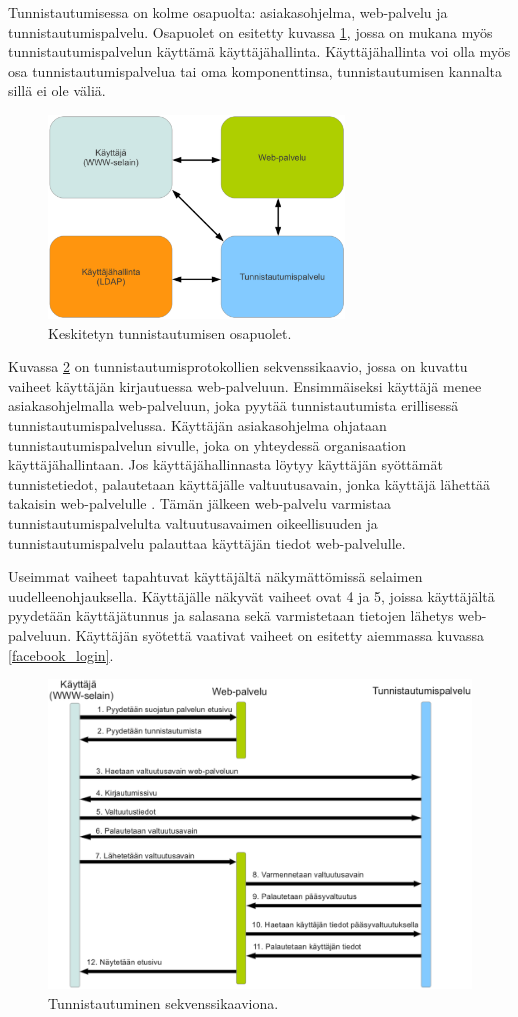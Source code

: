 Tunnistautumisessa on kolme osapuolta: asiakasohjelma, web-palvelu ja tunnistautumispalvelu. Osapuolet on esitetty kuvassa \ref{composition}, jossa on mukana myös tunnistautumispalvelun käyttämä käyttäjähallinta. Käyttäjähallinta voi olla myös osa tunnistautumispalvelua tai oma komponenttinsa, tunnistautumisen kannalta sillä ei ole väliä.

\begin{figure}[ht]
\centering
\includegraphics[width=0.7\textwidth]{teknologiat/composition.eps}
\caption{Keskitetyn tunnistautumisen osapuolet.}%
\label{composition}
\end{figure}

Kuvassa \ref{oauth} on tunnistautumisprotokollien sekvenssikaavio, jossa on kuvattu vaiheet käyttäjän kirjautuessa web-palveluun. Ensimmäiseksi käyttäjä menee asiakasohjelmalla web-palveluun, joka pyytää tunnistautumista erillisessä tunnistautumispalvelussa. Käyttäjän asiakasohjelma ohjataan tunnistautumispalvelun sivulle, joka on yhteydessä organisaation käyttäjähallintaan. Jos käyttäjähallinnasta löytyy käyttäjän syöttämät tunnistetiedot, palautetaan käyttäjälle valtuutusavain, jonka käyttäjä lähettää takaisin web-palvelulle \cite{nisti}. Tämän jälkeen web-palvelu varmistaa tunnistautumispalvelulta valtuutusavaimen oikeellisuuden ja tunnistautumispalvelu palauttaa käyttäjän tiedot web-palvelulle.

Useimmat vaiheet tapahtuvat käyttäjältä näkymättömissä selaimen uudelleenohjauksella. Käyttäjälle näkyvät vaiheet ovat 4 ja 5, joissa käyttäjältä pyydetään käyttäjätunnus ja salasana sekä varmistetaan tietojen lähetys web-palveluun. Käyttäjän syötettä vaativat vaiheet on esitetty aiemmassa kuvassa \ref{facebook_login}.

\begin{figure}[ht]
\centering
\includegraphics[width=\textwidth]{teknologiat/protokollat/oauth.eps}
\caption{Tunnistautuminen sekvenssikaaviona.}%
\label{oauth}
\end{figure}